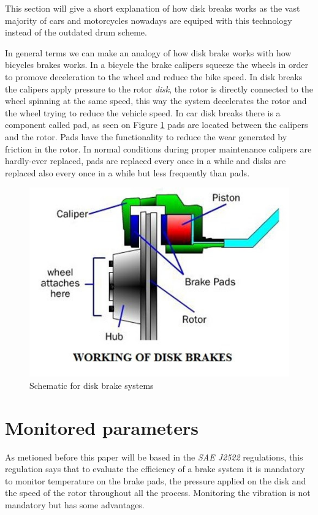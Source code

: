 		This section will give a short explanation of how disk breaks works as the vast majority of cars and motorcycles nowadays are equiped with this technology instead of the outdated drum scheme.
		\par
		In general terms we can make an analogy of how disk brake works with how bicycles brakes works. In a bicycle the brake calipers squeeze the wheels in order to promove deceleration to the wheel and reduce the bike speed. In disk breaks the calipers apply pressure to the rotor \textit{disk}, the rotor is directly connected to the wheel spinning at the same speed, this way the system decelerates the rotor and the wheel trying to reduce the vehicle speed. In car disk breaks there is a component called pad, as seen on Figure \ref{working-of-disk-breaks} pads are located between the calipers and the rotor. Pads have the functionality to reduce the wear generated by friction in the rotor. In normal conditions during proper maintenance calipers are hardly-ever replaced, pads are replaced every once in a while and disks are replaced also every once in a while but less frequently than pads.

		\begin{figure}[htbp]
			\centering
				\includegraphics[scale=0.55]{figuras/disk_brake_working}
			\caption{Schematic for disk brake systems  \cite{working-of-disk-breaks} }
			\label{working-of-disk-breaks}
		\end{figure}



	\section{Monitored parameters}
		As metioned before this paper will be based in the \textit{SAE J2522} regulations, this regulation says that to evaluate the efficiency of a brake system it is mandatory to monitor temperature on the brake pads, the pressure applied on the disk and the speed of the rotor throughout all the process. Monitoring the vibration is not mandatory but has some advantages.

